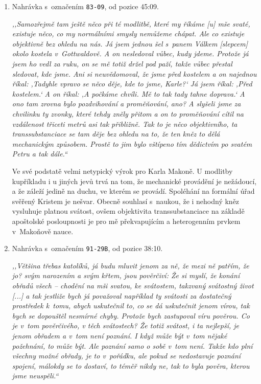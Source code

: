 \begin{enumerate}

\item{
Nahrávka s~označením \texttt{83-09}, od pozice 45:09.

\textit{%
,,Samozřejmě tam ještě něco při té modlitbě, které my říkáme [u] mše svaté,
existuje něco, co my normálními smysly nemůžeme chápat. Ale co existuje
objektivně bez ohledu na nás. Já jsem jednou šel s~panem Válkem [slepcem] okolo kostela
v~Gottwaldově. A on nesledoval vůbec, kudy jdeme. Protože já jsem ho vedl za
ruku, on se mě totiž držel pod paží, takže vůbec přestal sledovat, kde jsme. Ani
si neuvědomoval, že jsme před kostelem a on najednou říkal: ,Tadyhle vpravo se
něco děje, kde to jsme, Karle?{}` Já jsem říkal: ,Před kostelem.` A on říkal: ,A
počkáme chvíli. Mě to tak tady tahne doprava.` A ono tam zrovna bylo
pozdvihování a proměňování, ano? A slyšeli jsme za chvilinku ty zvonky, které
tehdy zněly přitom a on to proměňování cítil na vzdálenost třiceti metrů asi tak
přibližně. Tak to je něco objektivního, ta transsubstanciace se tam děje bez
ohledu na to, že ten kněz to dělá mechanickým způsobem. Prostě to jim bylo
vštípeno tím dědictvím po svatém Petru a tak dále.``
}

Ve své podstatě velmi netypický výrok pro Karla Makoně. U modlitby kupříkladu i
        u jiných jevů trvá na tom, že mechanické provádění je nežádoucí, a že
        záleží jedině na duchu, ve kterém se provádí. Spoléhání na formální úřad
        svěřený Kristem je nešvar. Obecně souhlasí s~naukou, že i nehodný kněz
        vysluhuje platnou svátost, ovšem objektivita transsubstanciace na
        základě apoštolské posloupnosti je pro mě překvapujícím a heterogenním
        prvkem v~Makoňově nauce.

}

\item{
Nahrávka s~označením \texttt{91-29B}, od pozice 38:10.

\textit{%
,,Většina třebas katolíků, já budu mluvit jenom za ně, že mezi ně patřím, že jo?
svým narozením a svým křtem, jsou pověrčiví: Že si myslí, že konání obřadů všech
-- chodění na mši svatou, ke svátostem, takzvaný svátostný život [...] a tak
jestliže bych já považoval například ty svátosti za dostatečný prostředek
k~tomu, abych uskutečnil to, co se dá uskutečnit jenom vírou, tak bych se
dopouštěl nesmírné chyby. Protože bych zastupoval víru pověrou. Co je v~tom
pověrčivého, v těch svátostech? Že totiž svátost, i ta nejlepší, je jenom
obřadem a v~tom není poznání. I když může být v~tom nějaké požehnání, to může
být. Ale poznání samo o sobě v~tom není. Takže kdo plní všechny možné obřady, je
to v~pořádku, ale pokud se nedostavuje poznání spojení, málokdy se to dostaví,
to téměř nikdy ne, tak to byla pověra, kterou jsme neuspěli.``
}

}
\end{enumerate}
